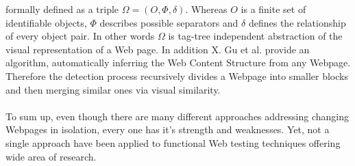 \documentclass[12pt, notitlepage]{article}
\begin{document}
formally defined as a triple $\Omega=(O,\Phi, \delta)$. Whereas $O$ is a finite set of identifiable objects, $\Phi$ describes
possible separators and $\delta$ defines the relationship of every object pair. In other words $\Omega$ is tag-tree independent 
abstraction of the visual representation of a Web page. In addition X. Gu et al.\cite{understanding-web-adaption} provide
an algorithm, automatically inferring the Web Content Structure from any Webpage. Therefore the detection process recursively 
divides a Webpage into smaller blocks and then merging similar ones via visual similarity. \\\\
To sum up, even though there are many different approaches addressing changing Webpages in isolation, every one has it's strength
and weaknesses. Yet, not a single approach have been applied to functional Web testing techniques offering wide area of research.
\newpage


\end{document}
